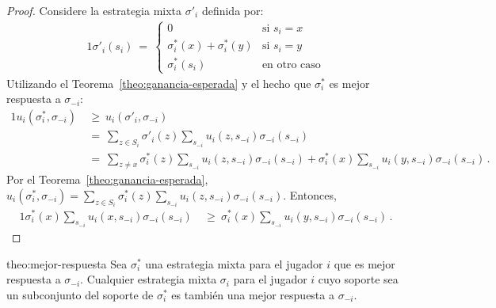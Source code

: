 \begin{proof}
Considere la estrategia mixta $\sigma'_i$ definida por:
\begin{alignat}{1}
	\sigma'_{i}(s_i)\ =\  
	\begin{cases}
		0 &  \text{si } s_i = x \\
		\sigma^*_i(x) + \sigma^*_i(y) & \text{si } s_i = y \\
		\sigma^*_i(s_i) & \text{en otro caso} 
	\end{cases}
\end{alignat}
Utilizando el Teorema~\ref{theo:ganancia-esperada} y el hecho que $\sigma^*_i$ es mejor respuesta a $\sigma_{-i}$:
\begin{alignat}{1}
  u_i(\sigma^*_i, \sigma_{-i})\ 
    &\geq\ u_i(\sigma'_i, \sigma_{-i}) \\
    &=\ \sum_{z \in S_i} \sigma'_i(z) \sum_{s_{-i}} u_i(z,s_{-i}) \sigma_{-i}(s_{-i}) \\
    &=\ \sum_{z\neq x} \sigma^*_i(z) \sum_{s_{-i}} u_i(z,s_{-i}) \sigma_{-i}(s_{-i}) + \sigma^*_i(x)\sum_{s_{-i}} u_i(y,s_{-i})\sigma_{-i}(s_{-i}) \,.
\end{alignat}
Por el Teorema~\ref{theo:ganancia-esperada},
$u_i(\sigma^*_i, \sigma_{-i})=\sum_{z \in S_i} \sigma^*_i(z) \sum_{s_{-i}} u_i(z,s_{-i}) \sigma_{-i}(s_{-i})$. Entonces,
\begin{alignat}{1}
  \label{eq:ineq-ganancias}
  \sigma^*_i(x) \sum_{s_{-i}} u_i(x,s_{-i}) \sigma_{-i}(s_{-i})\
    &\geq\ \sigma^*_i(x)\sum_{s_{-i}} u_i(y,s_{-i}) \sigma_{-i}(s_{-i}) \,.
\end{alignat}
\end{proof}


\begin{reptheorem}{theo:mejor-respuesta}
Sea $\sigma^*_i$ una estrategia mixta para el jugador $i$ que es mejor respuesta a $\sigma_{-i}$. Cualquier estrategia mixta $\sigma_i$ para el jugador $i$ cuyo soporte sea un subconjunto del soporte de $\sigma^*_i$ es también una mejor respuesta a $\sigma_{-i}$.
\end{reptheorem}

